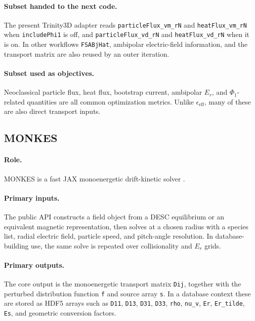 \documentclass[11pt]{article}
\newcommand{\code}[1]{\texttt{#1}}
\begin{document}
\paragraph{Subset handed to the next code.}
The present Trinity3D adapter reads \code{particleFlux\_vm\_rN} and
\code{heatFlux\_vm\_rN} when \code{includePhi1} is off, and
\code{particleFlux\_vd\_rN} and \code{heatFlux\_vd\_rN} when it is on. In
other workflows \code{FSABjHat}, ambipolar electric-field information, and the
transport matrix are also reused by an outer iteration.

\paragraph{Subset used as objectives.}
Neoclassical particle flux, heat flux, bootstrap current, ambipolar \(E_r\),
and \(\Phi_1\)-related quantities are all common optimization metrics. Unlike
\(\epsilon_{\mathrm{eff}}\), many of these are also direct transport inputs.

\subsection{MONKES}

\paragraph{Role.}
MONKES is a fast JAX monoenergetic drift-kinetic solver
\citep{Escoto2024MONKES,MONKESRepo}.

\paragraph{Primary inputs.}
The public API constructs a field object from a DESC equilibrium or an
equivalent magnetic representation, then solves at a chosen radius with a
species list, radial electric field, particle speed, and pitch-angle
resolution. In database-building use, the same solve is repeated over
collisionality and \(E_r\) grids.

\paragraph{Primary outputs.}
The core output is the monoenergetic transport matrix \code{Dij}, together with
the perturbed distribution function \code{f} and source array \code{s}. In a
database context these are stored as HDF5 arrays such as \code{D11},
\code{D13}, \code{D31}, \code{D33}, \code{rho}, \code{nu\_v}, \code{Er},
\code{Er\_tilde}, \code{Es}, and geometric conversion factors.
\end{document}
